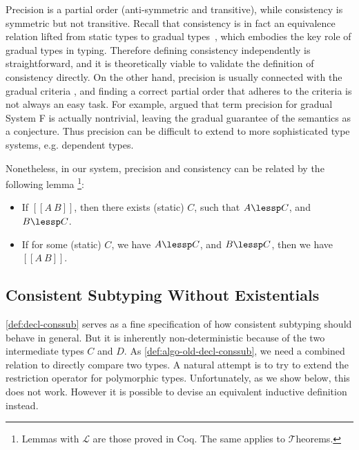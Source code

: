 Precision is a partial order (anti-symmetric and transitive), while consistency
is symmetric but not transitive. Recall that consistency is in fact an
equivalence relation lifted from static types to gradual
types~\citep{garcia2016abstracting}, which embodies the key role of gradual types
in typing. Therefore defining consistency independently is straightforward, and
it is theoretically viable to validate the definition of consistency directly.
On the other hand, precision is usually connected with the gradual criteria
\citep{siek2015refined}, and finding a correct partial order that adheres to the
criteria is not always an easy task. For example, \citet{yuu2017poly} argued
that term precision for gradual System F is actually nontrivial, leaving the
gradual guarantee of the semantics as a conjecture. Thus precision can be
difficult to extend to more sophisticated type systems, e.g. dependent types.

Nonetheless, in our system, precision and consistency can be related by the
following lemma \footnote{Lemmas with $\mathcal{L}$ are those proved in Coq. The
  same applies to $\mathcal{T}$heorems.}:

\begin{clemma}\leavevmode
  \label{lemma:consistency-precision}
  \begin{itemize}
  \item If $[[A ~ B]]$,
    then there exists (static) $C$,
    such that $A \lessp C$,
    and $B \lessp C$.
  \item If for some (static) $C$,
    we have $A \lessp C$,
    and $B \lessp C$,
    then we have $[[A ~ B]]$.
  \end{itemize}
\end{clemma}


\subsection{Consistent Subtyping Without Existentials}
\label{subsec:conssub-wo-exist}

\cref{def:decl-conssub} serves as a fine specification of how consistent
subtyping should behave in general. But it is inherently non-deterministic
because of the two intermediate types $C$ and $D$. As
\cref{def:algo-old-decl-conssub}, we need a combined relation to directly compare two
types. A natural attempt is to try to extend the restriction operator for
polymorphic types. Unfortunately, as we show below, this does not work. However
it is possible to devise an equivalent inductive definition instead.

